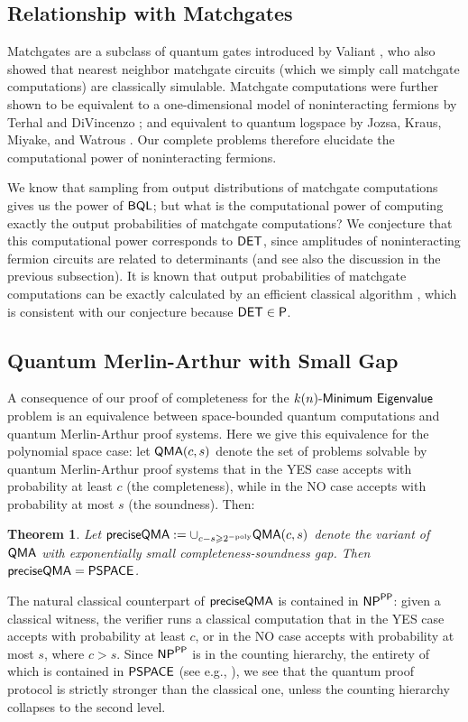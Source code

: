 \documentclass[11pt]{article}
\newcommand{\classfont}{\sf}
\newtheorem{theorem}[lemma]{Theorem}
\numberwithin{lemma}{section}
\theoremstyle{definition}
\newcommand\NP{\sf{NP}}
\newcommand\PP{\sf{PP}}
\newcommand\PSPACE{\sf{PSPACE}}
\newcommand\DET{{\sf{DET}}}
\newcommand\preciseQMA{{\sf{preciseQMA}}}
\newcommand\QMA{{\sf{QMA}}}
\newcommand{\unitaryBQL}{{\classfont{BQL}}}
\newcommand{\poly}{\mathrm{poly}}
\renewcommand{\ge}{\geqslant}
\newcommand\spechamiltonian[1]{#1\textit{\sf{-Minimum Eigenvalue}}}
\begin{document}
\subsection{Relationship with Matchgates}

Matchgates are a subclass of quantum gates introduced by Valiant \cite{Val02SIComp}, who also showed that nearest neighbor matchgate circuits (which we simply call matchgate computations) are classically simulable. Matchgate computations were further shown to be equivalent to a one-dimensional model of noninteracting fermions by Terhal and DiVincenzo \cite{TerDiV02PRA}; and equivalent to quantum logspace by Jozsa, Kraus, Miyake, and Watrous \cite{JozKraMiyWat10RSPA}. Our complete problems therefore elucidate the computational power of noninteracting fermions.

We know that sampling from output distributions of matchgate computations gives us the power of $\unitaryBQL$; but what is the computational power of computing exactly the output probabilities of matchgate computations? We conjecture that this computational power corresponds to $\DET$, since amplitudes of noninteracting fermion circuits are related to determinants (and see also the discussion in the previous subsection). It is known that output probabilities of matchgate computations can be exactly calculated by an efficient classical algorithm \cite{JozMiy08RSPA}, which is consistent with our conjecture because $\DET \in \classfont{P}$.

\subsection{Quantum Merlin-Arthur with Small Gap}
A consequence of our proof of completeness for the $\spechamiltonian{k(n)}$ problem is an equivalence between space-bounded quantum computations and quantum Merlin-Arthur proof systems. Here we give this equivalence for the polynomial space case: let $\QMA(c,s)$ denote the set of problems solvable by quantum Merlin-Arthur proof systems that in the YES case accepts with probability at least $c$ (the completeness), while in the NO case accepts with probability at most $s$ (the soundness). Then:
\begin{theorem} Let $\preciseQMA:= \cup_{c-s \ge 2^{-\poly}} \QMA(c,s)$ denote the variant of $\QMA$ with exponentially small completeness-soundness gap. Then
$\preciseQMA = \PSPACE$.
\end{theorem}

The natural classical counterpart of $\preciseQMA$ is contained in $\NP^{\PP}$: given a classical witness, the verifier runs a classical computation that in the YES case accepts with probability at least $c$, or in the NO case accepts with probability at most $s$, where $c>s$. %
Since $\NP^{\PP}$ is in the counting hierarchy, the entirety of which is contained in $\PSPACE$ (see e.g., \cite{allenderwagner}), we see that the quantum proof protocol is strictly stronger than the classical one, unless the counting hierarchy collapses to the second level.
\end{document}
